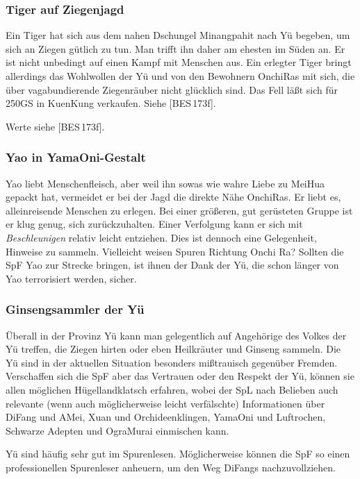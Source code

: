 \documentclass[
a4paper,
twoside,
DIV=calc,
BCOR=4mm,
fontsize=9pt,
twocolumn=on,
titlepage=on,
parskip=half
]{scrartcl}
\begin{document}
\subsubsection{Tiger auf Ziegenjagd}

Ein Tiger hat sich aus dem nahen Dschungel Minangpahit nach Yü
begeben, um sich an Ziegen gütlich zu tun. Man trifft ihn daher am
ehesten im Süden an. Er ist nicht unbedingt auf einen Kampf mit
Menschen aus. Ein erlegter Tiger bringt allerdings das Wohlwollen der
Yü und von den Bewohnern OnchiRas mit sich, die über vagabundierende
Ziegenräuber nicht glücklich sind. Das Fell läßt sich für 250GS in
KuenKung verkaufen. Siehe [BES\,173f].

Werte siehe [BES\,173f].

\subsubsection{Yao in YamaOni-Gestalt}

Yao liebt Menschenfleisch, aber weil ihn sowas wie wahre Liebe zu
MeiHua gepackt hat, vermeidet er bei der Jagd die direkte Nähe
OnchiRas. Er liebt es, alleinreisende Menschen zu erlegen. Bei einer
größeren, gut gerüsteten Gruppe ist er klug genug, sich
zurückzuhalten. Einer Verfolgung kann er sich mit \emph{Beschleunigen}
relativ leicht entziehen. Dies ist dennoch eine Gelegenheit, Hinweise
zu sammeln. Vielleicht weisen Spuren Richtung Onchi Ra? Sollten die
SpF Yao zur Strecke bringen, ist ihnen der Dank der Yü, die schon
länger von Yao terrorisiert werden, sicher.

\subsubsection{Ginsengsammler der Yü}

Überall in der Provinz Yü kann man gelegentlich auf Angehörige des
Volkes der Yü treffen, die Ziegen hirten oder eben Heilkräuter und
Ginseng sammeln. Die Yü sind in der aktuellen Situation besonders
mißtrauisch gegenüber Fremden. Verschaffen sich die SpF aber das
Vertrauen oder den Respekt der Yü, können sie allen möglichen
Hügellandklatsch erfahren, wobei der SpL nach Belieben auch relevante
(wenn auch möglicherweise leicht verfälschte) Informationen über
DiFang und AMei, Xuan und Orchideenklingen, YamaOni und Luftrochen,
Schwarze Adepten und OgraMurai einmischen kann.

Yü sind häufig sehr gut im Spurenlesen. Möglicherweise können die SpF
so einen professionellen Spurenleser anheuern, um den Weg DiFangs
nachzuvollziehen.
\end{document}
